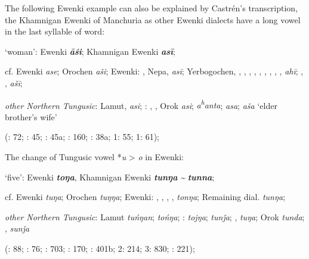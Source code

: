 \documentclass[output=paper,colorlinks,citecolor=brown]{langscibook}
\begin{document}
\ea
The following  Ewenki example can also be explained by Castrén’s transcription, the Khamnigan Ewenki of Manchuria as other Ewenki dialects have a long vowel in the last syllable of word:

\ea ‘woman’:  Ewenki \textbf{\textit{āśi}}; Khamnigan Ewenki \textbf{\textit{asī}};

    cf.  Ewenki \textit{ase}; Orochen \textit{aši};  Ewenki: , Nepa,  \textit{asī}; Yerbogochen, , , , , , , , , ,  \textit{ahī}; , ,  \textit{ašī};

    \textit{other Northern Tungusic}: Lamut,  \textit{asi}; \textit{}: , , Orok \textit{asi};  \textit{a\textsuperscript{h}}\textit{anta};  \textit{asa};  \textit{aša} ‘elder brother’s wife’
    
    (\citealt{Castrén1856}: 72; \citealt{Janhunen1991}: 45; \citealt{Dorji1998}: 45a; \citealt{Chaoke2014a}: 160; \citealt{Vasilevic1958}: 38a; \citealt{Cincius1975B} 1: 55; \citealt{Hauer1952} 1: 61);
\z
\z

\ea
The change of Tungusic vowel *\textit{u} > \textit{o} in  Ewenki:

\ea ‘five’:  Ewenki \textbf{\textit{toŋa}}, Khamnigan Ewenki \textbf{\textit{tunŋa}} \textit{{\textasciitilde}} \textbf{\textit{tunna}};

    cf.  Ewenki \textit{tuŋa}; Orochen \textit{tuŋŋa};  Ewenki: , , , ,  \textit{tonŋa}; Remaining dial. \textit{tunŋa};

    \textit{other Northern Tungusic}: Lamut \textit{tuńŋan};  \textit{tońŋa}; \textit{}:  \textit{tojŋa};  \textit{tunǰa}; ,  \textit{tuŋa}; Orok \textit{tunda}; ,  \textit{sunǰa}
    
    (\citealt{Castrén1856}: 88; \citealt{Janhunen1991}: 76; \citealt{Dorji1998}: 703; \citealt{Chaoke2014a}: 170; \citealt{Vasilevic1958}: 401b; \citealt{Cincius1975B} 2: 214; \citealt{Hauer1952} 3: 830; \citealt{Zikmundová2013a}: 221);
\end{document}
